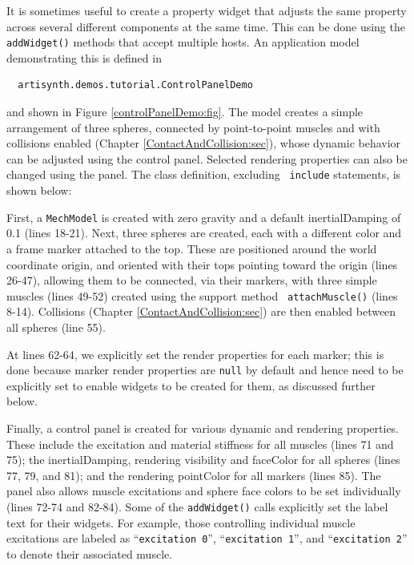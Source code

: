 It is sometimes useful to create a property widget that adjusts the
same property across several different components at the same time.
This can be done using the {\tt addWidget()} methods that accept
multiple hosts. An application model demonstrating this is defined in
%
\begin{verbatim}
  artisynth.demos.tutorial.ControlPanelDemo
\end{verbatim}
%
and shown in Figure \ref{controlPanelDemo:fig}.  The model creates a
simple arrangement of three spheres, connected by point-to-point
muscles and with collisions enabled
(Chapter \ref{ContactAndCollision:sec}), whose dynamic behavior can be
adjusted using the control panel. Selected rendering properties can
also be changed using the panel.  The class definition, excluding {\tt
include} statements, is shown below:
%
\lstset{numbers=left} 
\iflatexml

\else

\fi
\lstset{numbers=none}
%
First, a {\tt MechModel} is created with zero gravity and a default
{\sf inertialDamping} of 0.1 (lines 18-21). Next, three spheres are
created, each with a different color and a frame marker attached to
the top. These are positioned around the world coordinate origin, and
oriented with their tops pointing toward the origin (lines 26-47),
allowing them to be connected, via their markers, with three simple
muscles (lines 49-52) created using the support method {\tt
attachMuscle()} (lines 8-14). Collisions
(Chapter \ref{ContactAndCollision:sec}) are then enabled between all
spheres (line 55).

At lines 62-64, we explicitly set the render properties for each
marker; this is done because marker render properties are {\tt null}
by default and hence need to be explicitly set to enable widgets to be
created for them, as discussed further below.

Finally, a control panel is created for various dynamic and rendering
properties. These include the {\sf excitation} and material {\sf
stiffness} for all muscles (lines 71 and 75); the {\sf
inertialDamping}, rendering {\sf visibility} and {\sf faceColor} for
all spheres (lines 77, 79, and 81); and the rendering {\sf pointColor}
for all markers (lines 85). The panel also allows muscle excitations
and sphere face colors to be set individually (lines 72-74 and 82-84).
Some of the {\tt addWidget()} calls explicitly set the label text for
their widgets. For example, those controlling individual muscle
excitations are labeled as ``{\tt excitation 0}'', ``{\tt excitation
1}'', and ``{\tt excitation 2}'' to denote their associated muscle.

